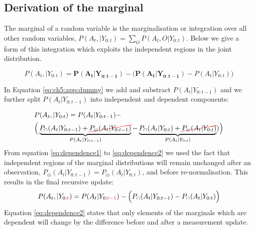 \begin{appendices}



\section{Derivation of the marginal}\label{appendix:marginal}

The marginal of a random variable is the marginalisation or integration over all other random variables, $P(A_t,|Y_{0:t}) = \sum\limits_{O} P(A_t,O|Y_{0:t})$. Below 
we give a form of this integration which exploits the independent regions in the joint distribution.

\begin{equation} \label{eq:ch5:app:dummy}
 P(A_t,|Y_{0:t}) = \mathbf{P(A_t|Y_{0:t-1})} - \Big(\mathbf{P(A_t|Y_{0:t-1})} - P(A_t|Y_{0:t}) \Big) 
\end{equation}

In Equation \ref{eq:ch5:app:dummy} we add and substract $P(A_t|Y_{0:t-1})$ and we further split 
$P(A_t|Y_{0:t-1})$ into independent and dependent components: 

\begin{align}
  &P(A_t,|Y_{0:t}) =  P(A_t|Y_{0:t-1}) - \nonumber \\ 
  &\Big(\underbrace{P_{\cap}(A_t|Y_{0:t-1}) + \Ccancel[red]{P_{\ominus}(A_t|Y_{0:t-1})}}_{P(A_t|Y_{0:t-1})} -  \underbrace{P_{\cap}(A_t|Y_{0:t}) + \Ccancel[red]{P_{\ominus}(A_t|Y_{0:t})}}_{P(A_t|Y_{0:t})})   \Big) \label{eq:dependence1} 
\end{align}
From equation \ref{eq:dependence1} to \ref{eq:dependence2} we used the fact that independent regions of the marginal distributions will remain unchanged after
an observation, $P_{\ominus}(A_t|Y_{0:t-1}) = P_{\ominus}(A_t|Y_{0:t})$, and before re-normalisation. This results in the final recursive update:
\begin{equation}
 P(A_t,|Y_{0:\color{red}{t}}) =  P(A_t|Y_{0:\color{red}{t-1}}) - \Big(P_{\cap}(A_t|Y_{0:t-1}) -  P_{\cap}(A_t|Y_{0:t})  \Big) \label{eq:dependence2} 
\end{equation}
Equation \ref{eq:dependence2} states that only elements of the marginals which are dependent will change by the difference
before and after a measurement update.

 
\end{appendices}

